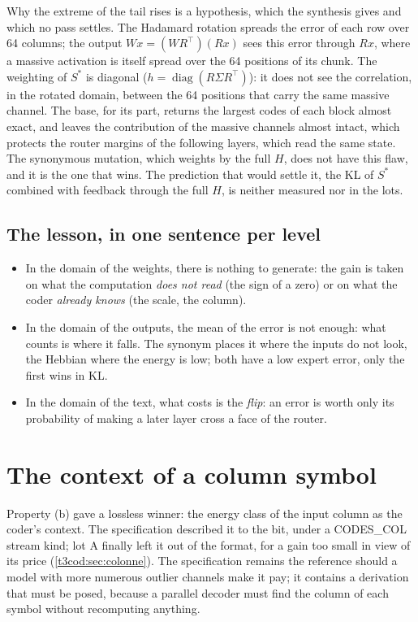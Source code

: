 Why the extreme of the tail rises is a hypothesis, which the synthesis gives and which no pass settles. The Hadamard rotation spreads the error of each row over 64 columns; the output $Wx = (WR^{\top})(Rx)$ sees this error through $Rx$, where a massive activation is itself spread over the 64 positions of its chunk. The weighting of $S^{*}$ is diagonal ($h = \operatorname{diag}(R\Sigma R^{\top})$): it does not see the correlation, in the rotated domain, between the 64 positions that carry the same massive channel. The base, for its part, returns the largest codes of each block almost exact, and leaves the contribution of the massive channels almost intact, which protects the router margins of the following layers, which read the same state. The synonymous mutation, which weights by the full $H$, does not have this flaw, and it is the one that wins. The prediction that would settle it, the KL of $S^{*}$ combined with feedback through the full $H$, is neither measured nor in the lots.

\subsection{The lesson, in one sentence per level}

\begin{itemize}
\item In the domain of the weights, there is nothing to generate: the gain is taken on what the computation \emph{does not read} (the sign of a zero) or on what the coder \emph{already knows} (the scale, the column).
\item In the domain of the outputs, the mean of the error is not enough: what counts is where it falls. The synonym places it where the inputs do not look, the Hebbian where the energy is low; both have a low expert error, only the first wins in KL.
\item In the domain of the text, what costs is the \emph{flip}: an error is worth only its probability of making a later layer cross a face of the router.
\end{itemize}

\section{The context of a column symbol}\label{t3syn:sec:codes-col}

Property (b) gave a lossless winner: the energy class of the input column as the coder's context. The specification described it to the bit, under a CODES\_COL stream kind; lot A finally left it out of the format, for a gain too small in view of its price (\cref{t3cod:sec:colonne}). The specification remains the reference should a model with more numerous outlier channels make it pay; it contains a derivation that must be posed, because a parallel decoder must find the column of each symbol without recomputing anything.

